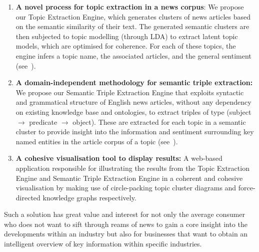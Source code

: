 \begin{enumerate}
    \item \textbf{A novel process for topic extraction in a news corpus}: We propose our Topic Extraction Engine, which generates clusters of news articles based on the semantic similarity of their text. The generated semantic clusters are then subjected to topic modelling (through LDA) to extract latent topic models, which are optimised for coherence. For each of these topics, the engine infers a topic name, the associated articles, and the general sentiment (see~).
    
    \item \textbf{A domain-independent methodology for semantic triple extraction:} We propose our Semantic Triple Extraction Engine that exploits syntactic and grammatical structure of English news articles, without any dependency on existing knowledge base and ontologies, to extract triples of type (subject $\rightarrow$ predicate $\rightarrow$ object). These are extracted for each topic in a semantic cluster to provide insight into the information and sentiment surrounding key named entities in the article corpus of a topic (see~).

    \item \textbf{A cohesive visualisation tool to display results:} A web-based application responsible for illustrating the results from the Topic Extraction Engine and Semantic Triple Extraction Engine in a coherent and cohesive visualisation by making use of circle-packing topic cluster diagrams and force-directed knowledge graphs respectively.


\end{enumerate}


Such a solution has great value and interest for not only the average consumer who does not want to sift through reams of news to gain a core insight into the developments within an industry but also for businesses that want to obtain an intelligent overview of key information within specific industries.



